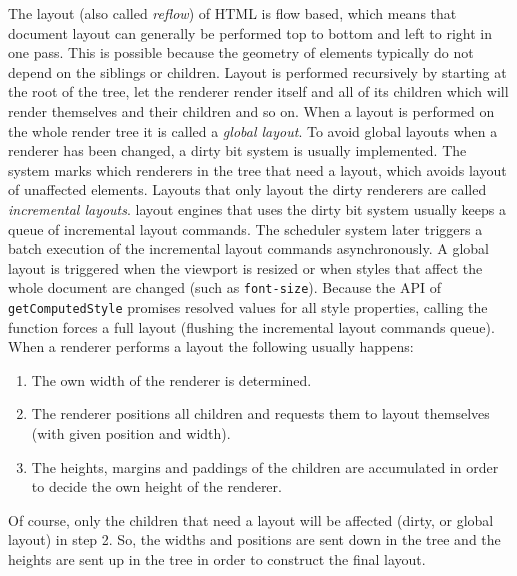\documentclass[a4paper,11pt]{kth-mag}
\newcommand{\code}[1]{\texttt{#1}}
\begin{document}
        The layout (also called \emph{reflow}) of \gls{HTML} is flow based, which means that \gls{document} layout can generally be performed top to bottom and left to right in one pass.
        This is possible because the geometry of \glspl{element} typically do not depend on the siblings or children.
        Layout is performed recursively by starting at the root of the tree, let the renderer render itself and all of its children which will render themselves and their children and so on.
        When a layout is performed on the whole \gls{render tree} it is called a \emph{global layout}.
        To avoid global layouts when a renderer has been changed, a dirty bit system is usually implemented.
        The system marks which renderers in the tree that need a layout, which avoids layout of unaffected \glspl{element}.
        Layouts that only layout the dirty renderers are called \emph{incremental layouts}.
        \Glspl{layout engine} that uses the dirty bit system usually keeps a queue of incremental layout commands.
        The scheduler system later triggers a batch execution of the incremental layout commands asynchronously.
        A global layout is triggered when the \gls{viewport} is resized or when styles that affect the whole \gls{document} are changed (such as \code{font-size}).
        Because the \gls{API} of \code{getComputedStyle} promises resolved values for all style properties, calling the function forces a full layout (flushing the incremental layout commands queue).
        When a renderer performs a layout the following usually happens:
        \begin{enumerate}
          \item The own width of the renderer is determined.
          \item The renderer positions all children and requests them to layout themselves (with given position and width).
          \item The heights, margins and paddings of the children are accumulated in order to decide the own height of the renderer.
        \end{enumerate}
        Of course, only the children that need a layout will be affected (dirty, or global layout) in step 2.
        So, the widths and positions are sent down in the tree and the heights are sent up in the tree in order to construct the final layout.
\end{document}
